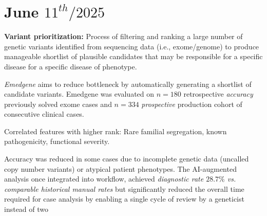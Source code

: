 \documentclass[../main.tex]{subfiles}
\begin{document}
\chapter{June $11^{th} / 2025$}
\label{ch:tufte-design}

 \cite{Meng2023}

\textbf{Variant prioritization:} Process of filtering and ranking a large number of genetic 
variants identified from sequencing data (i.e., exome/genome) to produce manageable shortlist of plausible candidates that may be responsible for a specific disease for a specific disease of phenotype.

\hrulefill

\textit{Emedgene} aims to reduce bottleneck by automatically generating a shortlist of candidate variants.
Emedgene was evaluated on $n=180$ retrospective \textit{accuracy} previously solved exome cases and $n=334$ \textit{prospective} production cohort of consecutive clinical cases.

Correlated features with higher rank: Rare familial segregation, known pathogenicity, functional severity.

Accuracy was reduced in some cases due to incomplete genetic data (uncalled copy number variants) or atypical patient phenotypes. The AI-augmented analysis once integrated into workflow, achieved \textit{diagnostic rate $28.7\%$ vs. comparable historical manual rates} but significantly reduced the overall time required for case analysis by enabling a single cycle of review by a geneticist instead of two

\hrulefill
\end{document}
